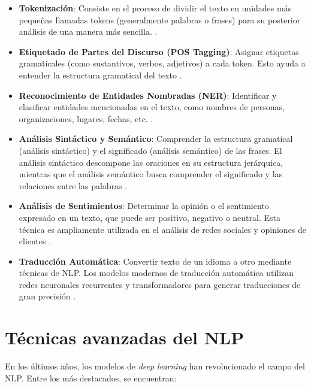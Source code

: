 \begin{itemize}
    \item \textbf{Tokenización}: Consiste en el proceso de dividir el texto en unidades más pequeñas llamadas tokens (generalmente palabras o frases) para su posterior análisis de una manera más sencilla.  \citep{jurafsky2020speech}.
    
    \item \textbf{Etiquetado de Partes del Discurso (POS Tagging)}: Asignar etiquetas gramaticales (como sustantivos, verbos, adjetivos) a cada token. Esto ayuda a entender la estructura gramatical del texto \citep{manning2014stanford}.
    
    \item \textbf{Reconocimiento de Entidades Nombradas (NER)}: Identificar y clasificar entidades mencionadas en el texto, como nombres de personas, organizaciones, lugares, fechas, etc. \citep{ratinov2009design}.
    
    \item \textbf{Análisis Sintáctico y Semántico}: Comprender la estructura gramatical (análisis sintáctico) y el significado (análisis semántico) de las frases. El análisis sintáctico descompone las oraciones en su estructura jerárquica, mientras que el análisis semántico busca comprender el significado y las relaciones entre las palabras \citep{jurafsky2020speech}.
    
    \item \textbf{Análisis de Sentimientos}: Determinar la opinión o el sentimiento expresado en un texto, que puede ser positivo, negativo o neutral. Esta técnica es ampliamente utilizada en el análisis de redes sociales y opiniones de clientes \citep{pang2008opinion}.
    
    \item \textbf{Traducción Automática}: Convertir texto de un idioma a otro mediante técnicas de NLP. Los modelos modernos de traducción automática utilizan redes neuronales recurrentes y transformadores para generar traducciones de gran precisión \citep{bahdanau2015neural}.
\end{itemize}

\section{Técnicas avanzadas del NLP}\label{tecnicas-avanzadas}
En los últimos años, los modelos de \textit{deep learning} han revolucionado el campo del NLP. Entre los más destacados, se encuentran:

